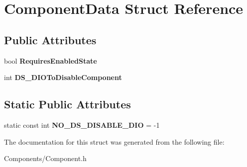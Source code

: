 \hypertarget{struct_component_data}{\section{\-Component\-Data \-Struct \-Reference}
\label{struct_component_data}
}
\subsection*{\-Public \-Attributes}
\begin{DoxyCompactItemize}
\item 
\hypertarget{struct_component_data_afafa4f0c57b348b26e8bfaaa3dbe43c3}{bool {\bfseries \-Requires\-Enabled\-State}}\label{struct_component_data_afafa4f0c57b348b26e8bfaaa3dbe43c3}

\item 
\hypertarget{struct_component_data_a53b08d9549a0e2b0453247f5672455af}{int {\bfseries \-D\-S\-\_\-\-D\-I\-O\-To\-Disable\-Component}}\label{struct_component_data_a53b08d9549a0e2b0453247f5672455af}

\end{DoxyCompactItemize}
\subsection*{\-Static \-Public \-Attributes}
\begin{DoxyCompactItemize}
\item 
\hypertarget{struct_component_data_adfdd5e2b8b8c5893594bdb28fc2adbe8}{static const int {\bfseries \-N\-O\-\_\-\-D\-S\-\_\-\-D\-I\-S\-A\-B\-L\-E\-\_\-\-D\-I\-O} = -\/1}\label{struct_component_data_adfdd5e2b8b8c5893594bdb28fc2adbe8}

\end{DoxyCompactItemize}


\-The documentation for this struct was generated from the following file\-:\begin{DoxyCompactItemize}
\item 
\-Components/\-Component.\-h\end{DoxyCompactItemize}

